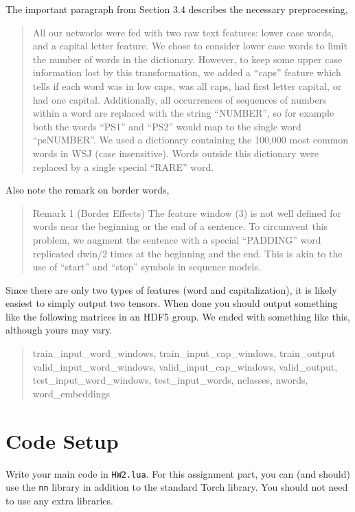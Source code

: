 \documentclass[11pt]{article}
\begin{document}
The important paragraph from Section 3.4 describes the necessary
preprocessing,

\begin{quote}
  All our networks were fed with two raw text features: lower case
  words, and a capital letter feature. We chose to consider lower case
  words to limit the number of words in the dictionary. However, to
  keep some upper case information lost by this transformation, we
  added a “caps” feature which tells if each word was in low caps, was
  all caps, had first letter capital, or had one
  capital. Additionally, all occurrences of sequences of numbers
  within a word are replaced with the string “NUMBER”, so for example
  both the words “PS1” and “PS2” would map to the single word
  “psNUMBER”. We used a dictionary containing the 100,000 most common
  words in WSJ (case insensitive). Words outside this dictionary were
  replaced by a single special “RARE” word.
\end{quote}


Also note the remark on border words, 

\begin{quote}
Remark 1 (Border Effects) The feature window (3) is not well defined for words near
the beginning or the end of a sentence. To circumvent this problem, we augment the sentence
with a special “PADDING” word replicated dwin/2 times at the beginning and the end. This
is akin to the use of “start” and “stop” symbols in sequence models.
\end{quote}

Since there are only two types of features (word and capitalization),
it is likely easiest to simply output two tensors. When done you
should output something like the following matrices in an HDF5
group. We ended with something like this, although yours may vary.

\begin{quote}
  train\_input\_word\_windows, train\_input\_cap\_windows,
  train\_output valid\_input\_word\_windows,
  valid\_input\_cap\_windows, valid\_output,
  test\_input\_word\_windows, test\_input\_words, nclasses, nwords,
  word\_embeddings
\end{quote}

\section{Code Setup}

Write your main code in \texttt{HW2.lua}. For this assignment part,
you can (and should) use the \texttt{nn} library in addition to the
standard Torch library. You should not need to use any extra libraries.
\end{document}
